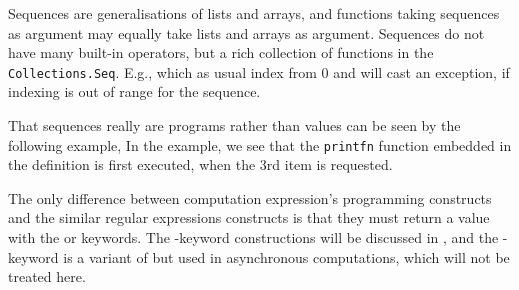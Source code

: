 \documentclass[fsharpNotes.tex]{subfiles}
\begin{document}
Sequences are generalisations of lists and arrays, and functions taking sequences as argument may equally take lists and arrays as argument. Sequences do not have many built-in operators, but a rich collection of functions in the \lstinline!Collections.Seq!. E.g.,
%
%
which as usual index from 0 and will cast an exception, if indexing is out of range for the sequence. 

That sequences really are programs rather than values can be seen by the following example,
%
%
In the example, we see that the \lstinline!printfn! function embedded in the definition is first executed, when the 3rd item is requested.


The only difference between computation expression's programming constructs and the similar regular expressions constructs is that they must return a value with the  or  keywords. The -keyword constructions will be discussed in , and the -keyword is a variant of  but used in asynchronous computations, which will not be treated here.

\end{document}
